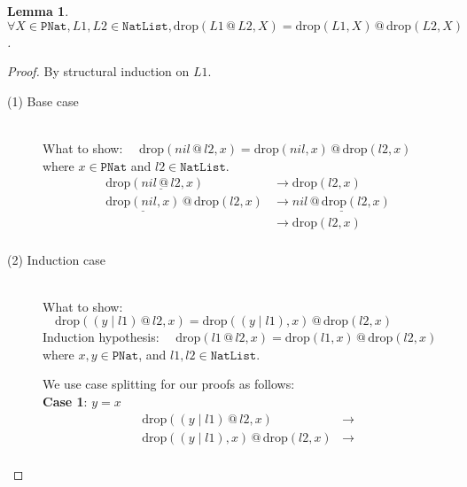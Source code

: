 \documentclass[12pt, a4paper]{article}
\newtheorem{lemma}[theorem]{Lemma}
\newcommand{\rel}[1]{\mathrel{#1}}
\newcommand{\rmx}[1]{\mathrm{#1}}
\newcommand{\larrow}{\longrightarrow}
\newcommand{\under}{\underline}
\begin{document}
\begin{lemma}
\label{lm1}
$\forall X \in \mathtt{PNat}, L1, L2 \in \mathtt{NatList}, \rmx{drop}(L1 \rel{@} L2, X) = \rmx{drop}(L1, X) \rel{@} \rmx{drop}(L2, X)$.
\end{lemma}
\begin{proof}
By structural induction on $L1$.

\begin{description}

\item[(1) Base case]~\\
\noindent
What to show: $\quad \rmx{drop}(nil \rel{@} l2, x) = \rmx{drop}(nil, x) \rel{@} \rmx{drop}(l2, x)$ \\
where $x \in \mathtt{PNat}$ and $l2 \in \mathtt{NatList}$.
\begin{align*}
\rmx{drop}(\under{nil \rel{@} l2}, x)
	&\larrow \rmx{drop}(l2, x) \tag{by @1} \\
\under{\rmx{drop}(nil, x)} \rel{@} \rmx{drop}(l2, x)
	&\larrow \under{nil \rel{@} \rmx{drop}(l2, x)} \tag{by drop1} \\
	&\larrow \rmx{drop}(l2, x) \tag{by @1} \\
\end{align*}

\item[(2) Induction case]~\\
What to show: $\quad \rmx{drop}((y \rel{|} l1) \rel{@} l2, x) = \rmx{drop}((y \rel{|} l1), x) \rel{@} \rmx{drop}(l2, x)$ \\
Induction hypothesis: $\quad \rmx{drop}(l1 \rel{@} l2, x) = \rmx{drop}(l1, x) \rel{@} \rmx{drop}(l2, x)$ \\
where $x, y \in \mathtt{PNat}$, and $l1, l2 \in \mathtt{NatList}$.

We use case splitting for our proofs as follows: \\
\textbf{Case 1}: $y = x$
\begin{align*}
\rmx{drop}((y \rel{|} l1) \rel{@} l2, x)
	&\larrow  \tag{by } \\
\rmx{drop}((y \rel{|} l1), x) \rel{@} \rmx{drop}(l2, x)
	&\larrow \tag{by diff2} \\
\end{align*}

\end{description}
\end{proof}
\end{document}
